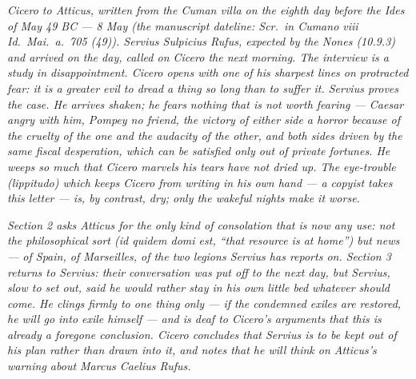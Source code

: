 
\textit{Cicero to Atticus, written from the Cuman villa
on the eighth day before the Ides of May 49 BC --- 8 May
(the manuscript dateline: \textit{Scr.\ in Cumano viii
Id.\ Mai.\ a.\ 705 (49)}). Servius Sulpicius Rufus,
expected by the Nones (10.9.3) and arrived on the day,
called on Cicero the next morning. The interview is a
study in disappointment. Cicero opens with one of his
sharpest lines on protracted fear: it is a greater evil
to dread a thing so long than to suffer it. Servius
proves the case. He arrives shaken; he fears nothing
that is not worth fearing --- Caesar angry with him,
Pompey no friend, the victory of either side a horror
because of the cruelty of the one and the audacity of
the other, and both sides driven by the same fiscal
desperation, which can be satisfied only out of private
fortunes. He weeps so much that Cicero marvels his tears
have not dried up. The eye-trouble (\textit{lippitudo})
which keeps Cicero from writing in his own hand --- a
copyist takes this letter --- is, by contrast, dry; only
the wakeful nights make it worse.}

\textit{Section 2 asks Atticus for the only kind of
consolation that is now any use: not the philosophical
sort (\textit{id quidem domi est}, ``that resource is at
home'') but news --- of Spain, of Marseilles, of the
two legions Servius has reports on. Section 3 returns to
Servius: their conversation was put off to the next day,
but Servius, slow to set out, said he would rather stay
in his own little bed whatever should come. He clings
firmly to one thing only --- if the condemned exiles
are restored, he will go into exile himself --- and is
deaf to Cicero's arguments that this is already a
foregone conclusion. Cicero concludes that Servius is
to be kept out of his plan rather than drawn into it,
and notes that he will think on Atticus's warning about
Marcus Caelius Rufus.}
